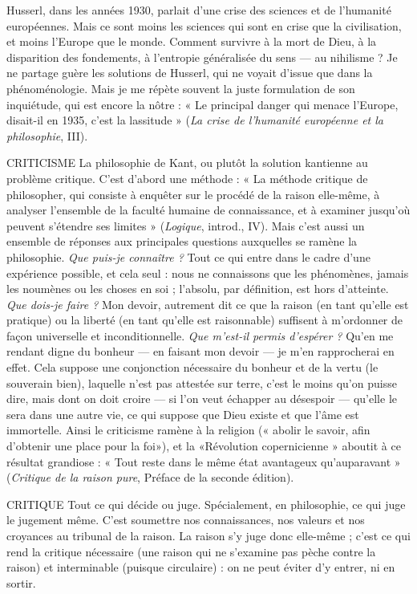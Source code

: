 Husserl, dans les années 1930, parlait d’une crise des sciences et de l’humanité
européennes. Mais ce sont moins les sciences qui sont en crise que la civilisation,
et moins l’Europe que le monde. Comment survivre à la mort de
Dieu, à la disparition des fondements, à l’entropie généralisée du sens — au
nihilisme ? Je ne partage guère les solutions de Husserl, qui ne voyait d’issue
que dans la phénoménologie. Mais je me répète souvent la juste formulation de
son inquiétude, qui est encore la nôtre : « Le principal danger qui menace
l’Europe, disait-il en 1935, c’est la lassitude » ({\it }{\it La crise de l'humanité européenne
et la philosophie}, III).

CRITICISME La philosophie de Kant, ou plutôt la solution kantienne au
problème critique. C’est d’abord une méthode : « La méthode
critique de philosopher, qui consiste à enquêter sur le procédé de la raison elle-même,
à analyser l’ensemble de la faculté humaine de connaissance, et à examiner
jusqu'où peuvent s'étendre ses limites » ({\it Logique}, introd., IV). Mais c’est
aussi un ensemble de réponses aux principales questions auxquelles se ramène
la philosophie. {\it Que puis-je connaître ?} Tout ce qui entre dans le cadre d’une
expérience possible, et cela seul : nous ne connaissons que les phénomènes,
jamais les noumènes ou les choses en soi ; l'absolu, par définition, est hors
d'atteinte. {\it Que dois-je faire ?} Mon devoir, autrement dit ce que la raison (en
tant qu’elle est pratique) ou la liberté (en tant qu’elle est raisonnable) suffisent
à m'ordonner de façon universelle et inconditionnelle. {\it Que m'est-il permis
d'espérer ?} Qu’en me rendant digne du bonheur — en faisant mon devoir — je
m'en rapprocherai en effet. Cela suppose une conjonction nécessaire du bonheur
et de la vertu (le souverain bien), laquelle n’est pas attestée sur terre, c’est
le moins qu’on puisse dire, mais dont on doit croire — si l’on veut échapper au
désespoir — qu’elle le sera dans une autre vie, ce qui suppose que Dieu existe et
que l’âme est immortelle. Ainsi le criticisme ramène à la religion (« abolir le
savoir, afin d'obtenir une place pour la foi»), et la «Révolution
copernicienne » aboutit à ce résultat grandiose : « Tout reste dans le même état
avantageux qu'auparavant » ({\it Critique de la raison pure}, Préface de la seconde
édition).

CRITIQUE Tout ce qui décide ou juge. Spécialement, en philosophie, ce
qui juge le jugement même. C’est soumettre nos connaissances,
nos valeurs et nos croyances au tribunal de la raison. La raison s’y juge
donc elle-même ; c’est ce qui rend la critique nécessaire (une raison qui ne
s’examine pas pèche contre la raison) et interminable (puisque circulaire) : on
ne peut éviter d’y entrer, ni en sortir.

